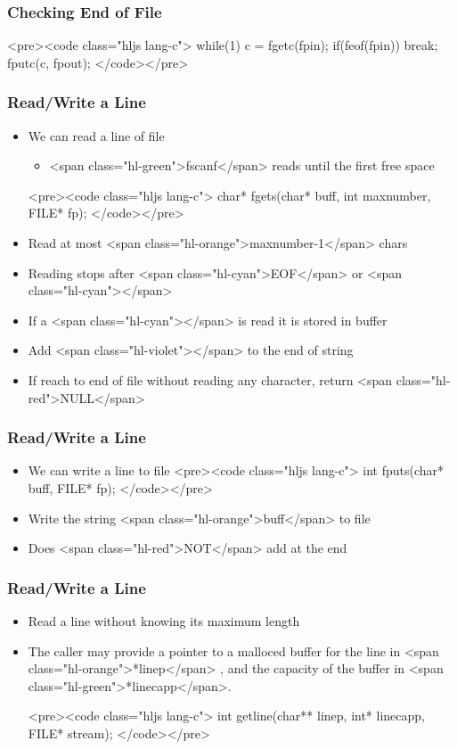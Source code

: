 \documentclass{../c-lecture}
\begin{document}
\begin{frame}
  \frametitle{Checking End of File}
  <pre><code class="hljs lang-c">
while(1){
  c = fgetc(fpin);
  if(feof(fpin))
    break;
  fputc(c, fpout);
}
  </code></pre>
\end{frame}
\begin{frame}
  \frametitle{Read/Write a Line}
  \begin{itemize}
    \item We can read a line of file
    \begin{itemize}
      \item
        <span class="hl-green">fscanf</span> reads until the first free space

    \end{itemize}
    <pre><code class="hljs lang-c">
char* fgets(char* buff, int maxnumber, FILE* fp);
    </code></pre>
    \item Read at most <span class="hl-orange">maxnumber-1</span> chars
    \item
      Reading stops after <span class="hl-cyan">EOF</span> or
      <span class="hl-cyan">\n</span>

    \item If a <span class="hl-cyan">\n</span> is read it is stored in buffer
    \item Add <span class="hl-violet">\0</span> to the end of string
    \item
      If reach to end of file without reading any character, return
      <span class="hl-red">NULL</span>

  \end{itemize}
\end{frame}
\begin{frame}
  \frametitle{Read/Write a Line}
  \begin{itemize}
    \item We can write a line to file
    <pre><code class="hljs lang-c">
int fputs(char* buff, FILE* fp);
    </code></pre>
    \item Write the string <span class="hl-orange">buff</span> to file
    \item Does <span class="hl-red">NOT</span> add \n at the end
  \end{itemize}
\end{frame}
\begin{frame}
  \frametitle{Read/Write a Line}
  \begin{itemize}
    \item Read a line without knowing its maximum length
    \item
      The caller may provide a pointer to a malloced buffer for the line in
      <span class="hl-orange">*linep</span> , and the capacity of the buffer in
      <span class="hl-green">*linecapp</span>.

    <pre><code class="hljs lang-c">
int getline(char** linep, int* linecapp, FILE* stream);
    </code></pre>
  \end{itemize}
\end{frame}
\end{document}
